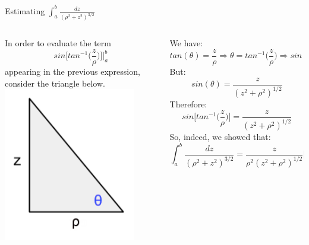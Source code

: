 \begin{frame}{Estimating $\int_{a}^{b} \frac{dz}{({\rho}^2+z^2)^{3/2}}$}

\begin{columns}
  \begin{column}{0.30\textwidth}
    {\small
     In order to evaluate the term
     \begin{equation*}
       sin\Big[ tan^{-1}\Big(\frac{z}{\rho}\Big) \Big] \biggr\rvert_{a}^{b}
     \end{equation*}
     appearing in the previous expression,
     consider the triangle below.\\
    }
    \includegraphics[width=0.85\textwidth]{./images/schematics/triangle_for_integral_in_wire_magnetic_field_calc.png}
  \end{column}
  \begin{column}{0.70\textwidth}
  {\small
    We have:
    \begin{equation*}
      tan(\theta) = \frac{z}{{\rho}} \Rightarrow
      \theta = tan^{-1}\Big( \frac{z}{{\rho}} \Big)  \Rightarrow
      sin(\theta) = sin\Big[ tan^{-1}\Big( \frac{z}{{\rho}} \Big) \Big]
    \end{equation*}
    But:
    \begin{equation*}
      sin(\theta) = \frac{z}{(z^2+{\rho}^2)^{1/2}}
    \end{equation*}
    Therefore:
    \begin{equation*}
       sin\Big[ tan^{-1}\Big( \frac{z}{{\rho}} \Big) \Big] = \frac{z}{(z^2+{\rho}^2)^{1/2}}
    \end{equation*}
    So, indeed, we showed that:
    \begin{equation*}
      \int_{a}^{b} \frac{dz}{({\rho}^2+z^2)^{3/2}} = \frac{z}{{\rho}^{2}(z^{2}+{{\rho}^{2}})^{1/2}} \biggr\rvert_{a}^{b}
    \end{equation*}
  }
  \end{column}
\end{columns}

\end{frame}
